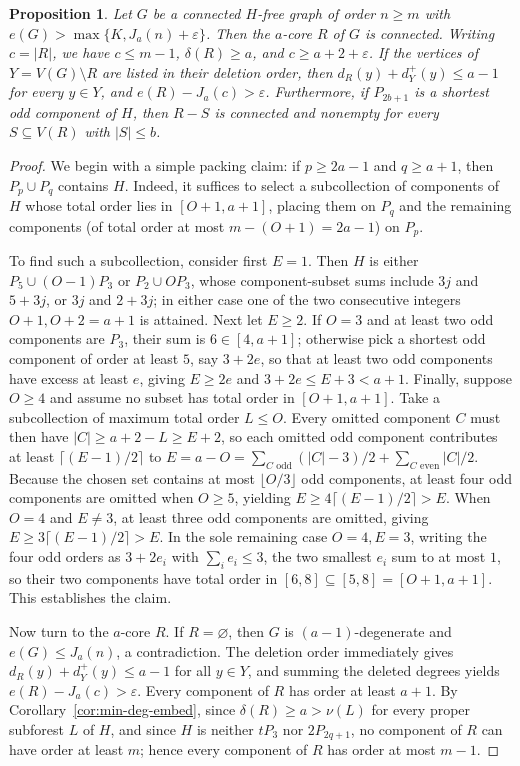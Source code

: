 \documentclass[10pt]{article}
\theoremstyle{compactplain}
\newtheorem{proposition}[theorem]{Proposition}
\theoremstyle{remark}\newtheorem{remark}[theorem]{Remark}
\begin{document}
\begin{proposition}\label{prop:core}
Let $G$ be a connected $H$-free graph of order $n\ge m$ with
$e(G)>\max\{K,J_a(n)+\varepsilon\}$. Then the $a$-core $R$ of $G$ is
connected. Writing $c=|R|$, we have $c\le m-1$, $\delta(R)\ge a$, and
$c\ge a+2+\varepsilon$. If the vertices of $Y=V(G)\setminus R$ are
listed in their deletion order, then $d_R(y)+d_Y^+(y)\le a-1$ for every
$y\in Y$, and $e(R)-J_a(c)>\varepsilon$. Furthermore, if $P_{2b+1}$ is a
shortest odd component of $H$, then $R-S$ is connected and nonempty for
every $S\subseteq V(R)$ with $|S|\le b$.
\end{proposition}
\begin{proof}
We begin with a simple packing claim: if $p\ge2a-1$ and $q\ge a+1$, then
$P_p\cup P_q$ contains $H$. Indeed, it suffices to select a subcollection
of components of $H$ whose total order lies in $[O+1,a+1]$, placing them
on $P_q$ and the remaining components (of total order at most
$m-(O+1)=2a-1$) on $P_p$.

To find such a subcollection, consider first $E=1$. Then $H$ is either
$P_5\cup(O-1)P_3$ or $P_2\cup OP_3$, whose component-subset sums include
$3j$ and $5+3j$, or $3j$ and $2+3j$; in either case one of the two
consecutive integers $O+1,O+2=a+1$ is attained. Next let $E\ge2$. If
$O=3$ and at least two odd components are $P_3$, their sum is
$6\in[4,a+1]$; otherwise pick a shortest odd component of order at least
$5$, say $3+2e$, so that at least two odd components have excess at
least $e$, giving $E\ge2e$ and $3+2e\le E+3<a+1$. Finally, suppose
$O\ge4$ and assume no subset has total order in $[O+1,a+1]$. Take a
subcollection of maximum total order $L\le O$. Every omitted component
$C$ must then have $|C|\ge a+2-L\ge E+2$, so each omitted odd component
contributes at least $\lceil(E-1)/2\rceil$ to
$E=a-O=\sum_{C\text{ odd}}(|C|-3)/2+\sum_{C\text{ even}}|C|/2$. Because
the chosen set contains at most $\lfloor O/3\rfloor$ odd components, at
least four odd components are omitted when $O\ge5$, yielding
$E\ge4\lceil(E-1)/2\rceil>E$. When $O=4$ and $E\ne3$, at least three odd
components are omitted, giving $E\ge3\lceil(E-1)/2\rceil>E$. In the sole
remaining case $O=4,E=3$, writing the four odd orders as $3+2e_i$ with
$\sum_i e_i\le3$, the two smallest $e_i$ sum to at most $1$, so their
two components have total order in $[6,8]\subseteq[5,8]=[O+1,a+1]$. This
establishes the claim.

Now turn to the $a$-core $R$. If $R=\varnothing$, then $G$ is
$(a-1)$-degenerate and $e(G)\le J_a(n)$, a contradiction. The deletion
order immediately gives $d_R(y)+d_Y^+(y)\le a-1$ for all $y\in Y$, and
summing the deleted degrees yields $e(R)-J_a(c)>\varepsilon$. Every
component of $R$ has order at least $a+1$. By
Corollary~\ref{cor:min-deg-embed}, since $\delta(R)\ge a>\nu(L)$ for
every proper subforest $L$ of $H$, and since $H$ is neither $tP_3$ nor
$2P_{2q+1}$, no component of $R$ can have order at least $m$; hence
every component of $R$ has order at most $m-1$.


\end{proof}
\end{document}
